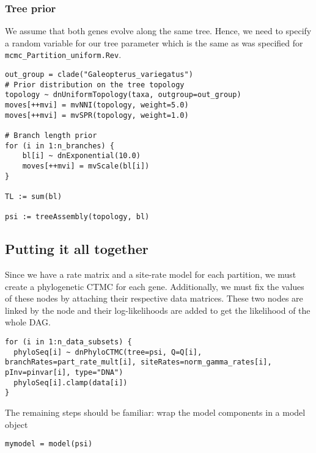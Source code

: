 \subsubsection{Tree prior}

We assume that both genes evolve along the same tree.
Hence, we need to specify a random variable for our tree parameter which is the same as was specified for {\tt mcmc\_Partition\_uniform.Rev}.
{\tt \begin{snugshade*}
\begin{lstlisting}
out_group = clade("Galeopterus_variegatus")
# Prior distribution on the tree topology	
topology ~ dnUniformTopology(taxa, outgroup=out_group)
moves[++mvi] = mvNNI(topology, weight=5.0)
moves[++mvi] = mvSPR(topology, weight=1.0)

# Branch length prior
for (i in 1:n_branches) {
    bl[i] ~ dnExponential(10.0)
	moves[++mvi] = mvScale(bl[i])
}

TL := sum(bl)
	
psi := treeAssembly(topology, bl)
\end{lstlisting}
\end{snugshade*}}


\subsection{Putting it all together}

Since we have a rate matrix and a site-rate model for each partition, we must create a phylogenetic CTMC for each gene. 
Additionally, we must fix the values of these nodes by attaching their respective data matrices.
These two nodes are linked by the  node and their log-likelihoods are added to get the likelihood of the whole DAG.
{\tt \begin{snugshade*}
\begin{lstlisting}
for (i in 1:n_data_subsets) {
  phyloSeq[i] ~ dnPhyloCTMC(tree=psi, Q=Q[i], branchRates=part_rate_mult[i], siteRates=norm_gamma_rates[i], pInv=pinvar[i], type="DNA")
  phyloSeq[i].clamp(data[i])
}
\end{lstlisting}
\end{snugshade*}}

The remaining steps should be familiar:
wrap the model components in a model object

{\tt \begin{snugshade*}
\begin{lstlisting}
mymodel = model(psi)
\end{lstlisting}
\end{snugshade*}}

